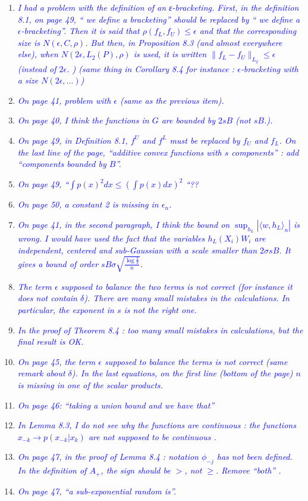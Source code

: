 \documentclass[pdftex,12pt]{article}
\def\rc#1{{\it\textcolor{blue}{#1}}\smallskip}
\begin{document}
\begin{enumerate}
\item \rc{I had a problem with the definition of an ε-bracketing. First, in the
definition 8.1, on page 49, `` we define a bracketing'' should be
replaced by `` we define a $\epsilon$-bracketing''. Then it is said that $\rho(f_L ,
f_U ) \leq \epsilon$ and that the corresponding size is $N(\epsilon,C,\rho)$. But then, in
Proposition 8.3 (and almost everywhere else), when $N(2\epsilon,L_2(P),\rho)$ is
used, it is written $\|f_L − f_U \|_{L_2} \leq \epsilon$ (instead of $2\epsilon$. ) (same thing in
Corollary 8.4 for instance : $\epsilon$-bracketing with a size $N(2\epsilon,...)$)}
\item \rc{On page 41, problem with $\epsilon$ (same as the previous item).}
\item \rc{On page 40, I think the functions in $G$ are bounded by $2sB$ (not $sB$.).}
\item \rc{On page 49, in Definition 8.1, $f^U$ and $f^L$ must be replaced by $f_U$ and
$f_L$. On the last line of the page, ``additive convex functions with $s$
components'' : add ``components bounded by $B$''.}
\item \rc{On page 49, ``$\int p(x)^2dx \leq (\int p(x)dx)^2$ ``??}
\item \rc{On page 50, a constant 2 is missing in $\epsilon_n$.}
\item \rc{On page 41, in the second paragraph, I think the bound on $\sup_{h_L} |⟨w,h_L⟩_n|$ is
wrong. I would have used the fact that the variables $h_L(X_i) W_i$ are
independent, centered and sub-Gaussian with a scale smaller than
$2\sigma s B$. It gives a bound of order $sB\sigma \sqrt{\frac{\log\frac{2}{\delta}}{n}}$.}
\item \rc{The term $\epsilon$ supposed to balance the two terms is not correct (for
instance it does not contain $\delta$). There are many small mistakes in the
calculations. In particular, the exponent in $s$ is not the right one.}
\item \rc{In the proof of Theorem 8.4 : too many small mistakes in
calculations, but the final result is OK.}
\item \rc{On page 45, the term $\epsilon$ supposed to balance the terms is not correct
(same remark about $\delta$). In the last equations, on the first line (bottom
of the page) $n$ is missing in one of the scalar products.}
\item \rc{On page 46: ``taking a union bound and we have that''}
\item \rc{In Lemma 8.3, I do not see why the functions are continuous : the
functions $x_{-k} \rightarrow p(x_{-k} | x_k)$ are not supposed to be continuous .}
\item \rc{On page 47, in the proof of Lemma 8.4 : notation $\phi_{-j}$
  has not been defined.
In the definition of $A_+$, the sign should be $>$, not $\geq$. Remove ``both'' .}
\item \rc{On page 47, ``a sub-exponential random is''.}

\end{enumerate}
\end{document}
